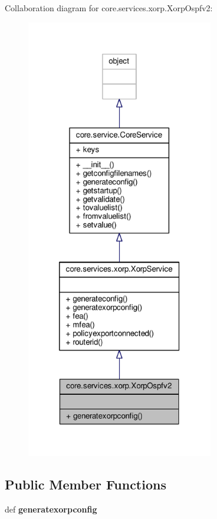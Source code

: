 Collaboration diagram for core.\+services.\+xorp.\+Xorp\+Ospfv2\+:
\nopagebreak
\begin{figure}[H]
\begin{center}
\leavevmode
\includegraphics[height=550pt]{classcore_1_1services_1_1xorp_1_1_xorp_ospfv2__coll__graph}
\end{center}
\end{figure}
\subsection*{Public Member Functions}
\begin{DoxyCompactItemize}
\item 
\hypertarget{classcore_1_1services_1_1xorp_1_1_xorp_ospfv2_ae047c69fdc6542e58e47fda804dbee56}{def {\bfseries generatexorpconfig}}\label{classcore_1_1services_1_1xorp_1_1_xorp_ospfv2_ae047c69fdc6542e58e47fda804dbee56}

\end{DoxyCompactItemize}
